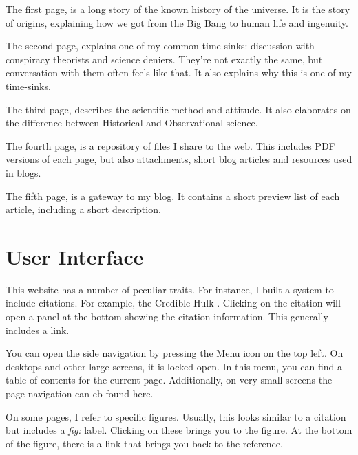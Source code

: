 \begin{multicols}{2}
The first page,  is a long story of the known history of the universe. It is the story of origins, explaining how we got from the Big Bang to human life and ingenuity.

The second page,  explains one of my common time-sinks: discussion with conspiracy theorists and science deniers. They're not exactly the same, but conversation with them often feels like that. It also explains why this is one of my time-sinks.

The third page,  describes the scientific method and attitude. It also elaborates on the difference between Historical and Observational science.

The fourth page,  is a repository of files I share to the web. This includes PDF versions of each page, but also attachments, short blog articles and resources used in blogs. 

The fifth page,  is a gateway to my blog. It contains a short preview list of each article, including a short description. 

\section{User Interface}

This website has a number of peculiar traits. For instance, I built a system to include citations. For example, the Credible Hulk \cite{crediblehulk}. Clicking on the citation will open a panel at the bottom showing the citation information. This generally includes a link.

You can open the side navigation by pressing the Menu icon on the top left. On desktops and other large screens, it is locked open. In this menu, you can find a table of contents for the current page. Additionally, on very small screens the page navigation can eb found here.

On some pages, I refer to specific figures. Usually, this looks similar to a citation but includes a \emph{fig:} label. Clicking on these brings you to the figure. At the bottom of the figure, there is a link that brings you back to the reference.
\end{multicols}
